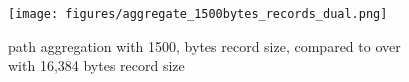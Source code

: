 \begin{figure}
  \texttt{[image: figures/aggregate\_1500bytes\_records\_dual.png]}
  \caption{\tcpls path aggregation with 1500, bytes record size, compared to
    \tls over \mptcp with 16,384 bytes record size}
  \label{fig:aggregation_1500bytes_records}
\end{figure}

%
%
%

